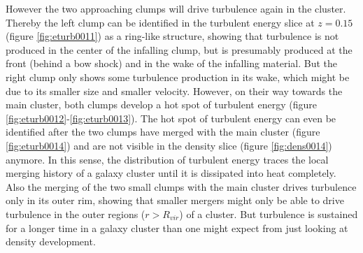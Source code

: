 However the two approaching clumps will drive turbulence again in the cluster.
Thereby the left clump can be identified in the turbulent energy slice at
$z=0.15$ (figure \ref{fig:eturb0011}) as a ring-like structure, showing that
turbulence is not produced in the center of the infalling clump, but is
presumably produced at the front (behind a 
bow shock) and in the wake of the infalling material. But the right clump only
shows some turbulence production in its wake, which might be due to its smaller
size and smaller velocity. However, on their way towards the main cluster, both
clumps develop a hot spot of turbulent energy (figure
\ref{fig:eturb0012}-\ref{fig:eturb0013}). The hot spot of turbulent energy can
even be identified after the two clumps have merged with the main cluster
(figure \ref{fig:eturb0014}) and are not visible in the density slice (figure
\ref{fig:dens0014}) anymore. In this sense,
the distribution of turbulent energy traces the local merging history of a
galaxy cluster until it is dissipated into heat completely. Also the merging of
the two small clumps with the main cluster drives turbulence only in its
outer rim, showing that smaller mergers might only be able to drive turbulence
in the outer regions ($r > R_{vir}$) of a cluster. But turbulence is
sustained for a longer time in a galaxy cluster than one might expect from just
looking at density development.

